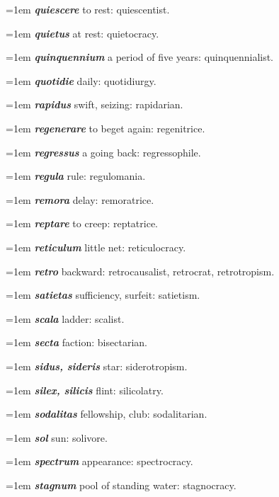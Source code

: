 \hangindent=1em \textbf{\textit{quiescere}} to rest: quiescentist.\par
\hangindent=1em \textbf{\textit{quietus}} at rest: quietocracy.\par
\hangindent=1em \textbf{\textit{quinquennium}} a period of five years: quinquennialist.\par
\hangindent=1em \textbf{\textit{quotidie}} daily: quotidiurgy.\par
\hangindent=1em \textbf{\textit{rapidus}} swift, seizing: rapidarian.\par
\hangindent=1em \textbf{\textit{regenerare}} to beget again: regenitrice.\par
\hangindent=1em \textbf{\textit{regressus}} a going back: regressophile.\par
\hangindent=1em \textbf{\textit{regula}} rule: regulomania.\par
\hangindent=1em \textbf{\textit{remora}} delay: remoratrice.\par
\hangindent=1em \textbf{\textit{reptare}} to creep: reptatrice.\par
\hangindent=1em \textbf{\textit{reticulum}} little net: reticulocracy.\par
\hangindent=1em \textbf{\textit{retro}} backward: retrocausalist, retrocrat, retrotropism.\par
\hangindent=1em \textbf{\textit{satietas}} sufficiency, surfeit: satietism.\par
\hangindent=1em \textbf{\textit{scala}} ladder: scalist.\par
\hangindent=1em \textbf{\textit{secta}} faction: bisectarian.\par
\hangindent=1em \textbf{\textit{sidus, sideris}} star: siderotropism.\par
\hangindent=1em \textbf{\textit{silex, silicis}} flint: silicolatry.\par
\hangindent=1em \textbf{\textit{sodalitas}} fellowship, club: sodalitarian.\par
\hangindent=1em \textbf{\textit{sol}} sun: solivore.\par
\hangindent=1em \textbf{\textit{spectrum}} appearance: spectrocracy.\par
\hangindent=1em \textbf{\textit{stagnum}} pool of standing water: stagnocracy.\par
